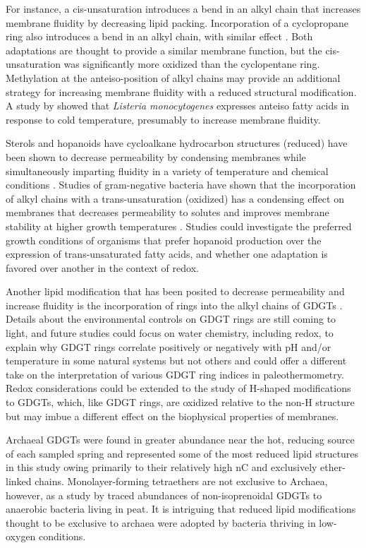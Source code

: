 For instance, a cis-unsaturation introduces a bend in an alkyl chain that increases membrane fluidity by decreasing lipid packing. Incorporation of a cyclopropane ring also introduces a bend in an alkyl chain, with similar effect \citep{zhang2008membrane}. Both adaptations are thought to provide a similar membrane function, but the cis-unsaturation was significantly more oxidized than the cyclopentane ring. Methylation at the anteiso-position of alkyl chains may provide an additional strategy for increasing membrane fluidity with a reduced structural modification. A study by \citep{zhu2005precursor} showed that \textit{Listeria monocytogenes} expresses anteiso fatty acids in response to cold temperature, presumably to increase membrane fluidity.

Sterols and hopanoids have cycloalkane hydrocarbon structures (reduced) have been shown to decrease permeability by condensing membranes while simultaneously imparting fluidity in a variety of temperature and chemical conditions \citep{belin2018hopanoid}. Studies of gram-negative bacteria have shown that the incorporation of alkyl chains with a trans-unsaturation (oxidized) has a condensing effect on membranes that decreases permeability to solutes \citep{halverson2000differential} and improves membrane stability at higher growth temperatures \citep{heipieper1996effect}. Studies could investigate the preferred growth conditions of organisms that prefer hopanoid production over the expression of trans-unsaturated fatty acids, and whether one adaptation is favored over another in the context of redox.

Another lipid modification that has been posited to decrease permeability and increase fluidity is the incorporation of rings into the alkyl chains of GDGTs \citep{sollich2017heat}. Details about the environmental controls on GDGT rings are still coming to light, and future studies could focus on water chemistry, including redox, to explain why GDGT rings correlate positively or negatively with pH and/or temperature in some natural systems but not others \citep{jia2014differential, boyd2013role} and could offer a different take on the interpretation of various GDGT ring indices in paleothermometry. Redox considerations could be extended to the study of H-shaped modifications to GDGTs, which, like GDGT rings, are oxidized relative to the non-H structure but may imbue a different effect on the biophysical properties of membranes.

Archaeal GDGTs were found in greater abundance near the hot, reducing source of each sampled spring and represented some of the most reduced lipid structures in this study owing primarily to their relatively high nC and exclusively ether-linked chains. Monolayer-forming tetraethers are not exclusive to Archaea, however, as a study by \cite{} traced abundances of non-isoprenoidal GDGTs to anaerobic bacteria living in peat. It is intriguing that reduced lipid modifications thought to be exclusive to archaea were adopted by bacteria thriving in low-oxygen conditions.

